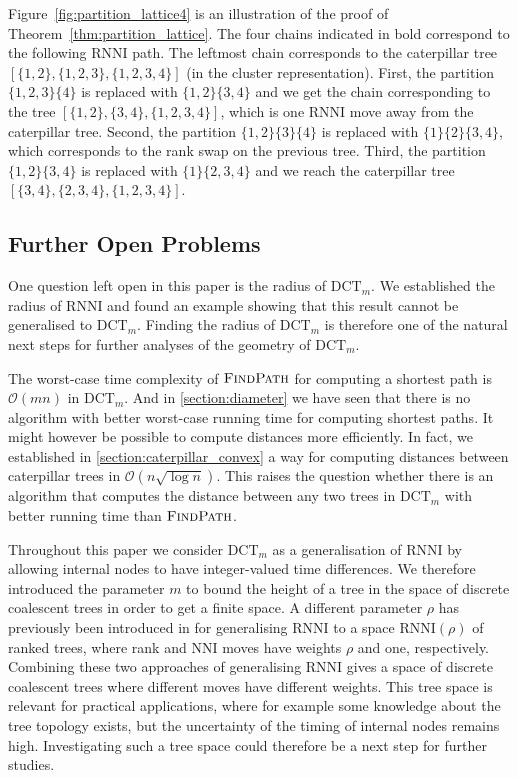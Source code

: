 \documentclass[11pt]{amsart}
\newcommand{\rnni}{\mathrm{RNNI}}
\newcommand{\findpath}{\textsc{FindPath}}
\newcommand{\nni}{\mathrm{NNI}}
\newcommand{\dtt}{\mathrm{DCT}}
\renewcommand{\O}{\mathcal O}
\newcommand{\summary}[1]{} %
\begin{document}
Figure~\ref{fig:partition_lattice4} is an illustration of the proof of Theorem~\ref{thm:partition_lattice}.
The four chains indicated in bold correspond to the following $\rnni$ path.
The leftmost chain corresponds to the caterpillar tree $[\{1, 2\}, \{1, 2, 3\}, \{1, 2, 3, 4\}]$ (in the cluster representation).
First, the partition $\{1, 2, 3\} \{4\}$ is replaced with $\{1, 2\} \{3, 4\}$ and we get the chain corresponding to the tree $[\{1, 2\}, \{3, 4\}, \{1, 2, 3, 4\}]$, which is one $\rnni$ move away from the caterpillar tree.
Second, the partition $\{1, 2\} \{3\} \{4\}$ is replaced with $\{1\} \{2\} \{3, 4\}$, which corresponds to the rank swap on the previous tree.
Third, the partition $\{1, 2\} \{3, 4\}$ is replaced with $\{1\} \{2, 3, 4\}$ and we reach the caterpillar tree $[\{3,4\}, \{2, 3, 4\}, \{1, 2, 3, 4\}]$.

\subsection{Further Open Problems}

\summary{Radius $\dtt_m$}
One question left open in this paper is the radius of $\dtt_m$.
We established the radius of $\rnni$ and found an example showing that this result cannot be generalised to $\dtt_m$.
Finding the radius of $\dtt_m$ is therefore one of the natural next steps for further analyses of the geometry of $\dtt_m$.

\summary{More efficient algorithm for computing distances (not shortest paths)}
The worst-case time complexity of $\findpath$ for computing a shortest path is $\O(mn)$ in $\dtt_m$.
And in \autoref{section:diameter} we have seen that there is no algorithm with better worst-case running time for computing shortest paths.
It might however be possible to compute distances more efficiently.
In fact, we established in \autoref{section:caterpillar_convex} a way for computing distances between caterpillar trees in $\O(n \sqrt{\log n})$.
This raises the question whether there is an algorithm that computes the distance between any two trees in $\dtt_m$ with better running time than $\findpath$.

\summary{$\rnni(rho)$ and parameter $\rho$ for discrete coalescent trees}
Throughout this paper we consider $\dtt_m$ as a generalisation of $\rnni$ by allowing internal nodes to have integer-valued time differences.
We therefore introduced the parameter $m$ to bound the height of a tree in the space of discrete coalescent trees in order to get a finite space.
A different parameter $\rho$ has previously been introduced in \textcite{Collienne2020-iu} for generalising $\rnni$ to a space $\rnni(\rho)$ of ranked trees, where rank and $\nni$ moves have weights $\rho$ and one, respectively.
Combining these two approaches of generalising $\rnni$ gives a space of discrete coalescent trees where different moves have different weights.
This tree space is relevant for practical applications, where for example some knowledge about the tree topology exists, but the uncertainty of the timing of internal nodes remains high.
Investigating such a tree space could therefore be a next step for further studies.
\end{document}
